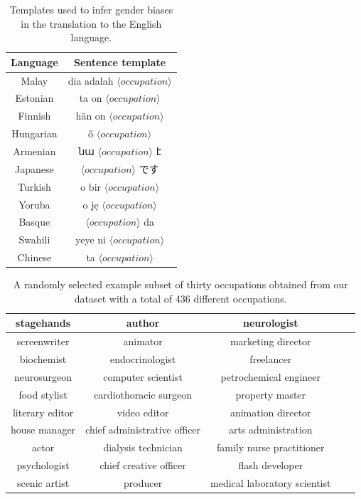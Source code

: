 \documentclass{article}
\begin{document}
\begin{table}[H]
	\centering
	\begin{tabular}{|c|c|}
	\hline
	Language 	& Sentence template \\ \hline \hline
	Malay		& dia adalah $\langle occupation \rangle$ \\ \hline
	Estonian	& ta on $\langle occupation \rangle$ \\ \hline
	Finnish		& hän on $\langle occupation \rangle$ \\ \hline
	Hungarian	& ő $\langle occupation \rangle$ \\ \hline
	Armenian	& նա $\langle occupation \rangle$ է \\ \hline
	Japanese	& $\langle occupation \rangle$ です\\ \hline
	Turkish		& o bir $\langle occupation \rangle$ \\ \hline
	Yoruba		& o jẹ $\langle occupation \rangle$ \\ \hline
	Basque		& $\langle occupation \rangle$ da \\ \hline
	Swahili		& yeye ni $\langle occupation \rangle$ \\ \hline
	Chinese		& ta $\langle occupation \rangle$ \\ \hline
	\end{tabular}
	\label{tab:templates}
	\caption{Templates used to infer gender biases in the translation to the English language.}
\end{table}

\begin{table}[H]
	\centering
	\begin{tabular}{|c|c|c|c|c|}
	\hline
	stagehands & author & neurologist \\ \hline
	screenwriter & animator & marketing director \\ \hline
	biochemist & endocrinologist & freelancer \\ \hline
	neurosurgeon & computer scientist & petrochemical engineer \\ \hline
	food stylist & cardiothoracic surgeon & property master \\ \hline
	literary editor & video editor & animation director \\ \hline
	house manager & chief administrative officer & arts administration \\ \hline
	actor & dialysis technician & family nurse practitioner \\ \hline
	psychologist & chief creative officer & flash developer \\ \hline
	scenic artist & producer & medical laboratory scientist \\ \hline
	\end{tabular}
	\label{tab:occupations-examples}
	\caption{A randomly selected example subset of thirty occupations obtained from our dataset with a total of 436 different occupations.}
\end{table}
\end{document}
